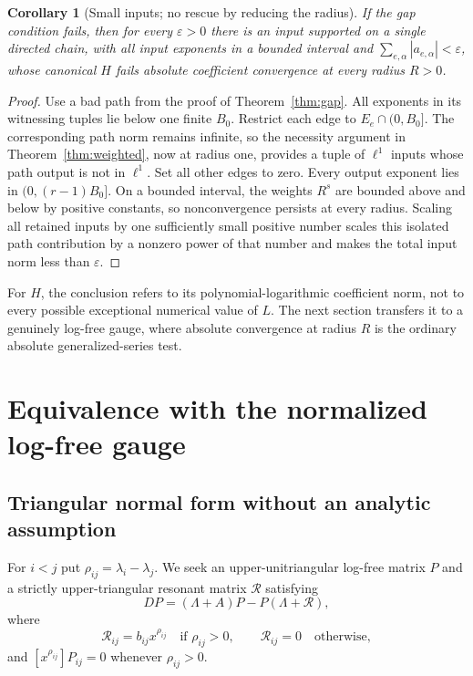 \documentclass[11pt,a4paper]{article}
\numberwithin{equation}{section}
\newtheorem{corollary}[theorem]{Corollary}
\theoremstyle{definition}
\theoremstyle{remark}
\newcommand{\eps}{\varepsilon}
\begin{document}
\begin{corollary}[Small inputs; no rescue by reducing the radius]
\label{cor:allradii}
If the gap condition fails, then for every $\eps>0$ there is an input
supported on a single directed chain, with all input exponents in a
bounded interval and
$\sum_{e,\alpha}|a_{e,\alpha}|<\eps$, whose canonical $H$ fails absolute
coefficient convergence at every radius $R>0$.
\end{corollary}
\begin{proof}
Use a bad path from the proof of Theorem~\ref{thm:gap}. All exponents in
its witnessing tuples lie below one finite $B_0$. Restrict each edge to
$E_e\cap(0,B_0]$. The corresponding path norm remains infinite, so the
necessity argument in Theorem~\ref{thm:weighted}, now at radius one,
provides a tuple of $\ell^1$ inputs whose path output is not in $\ell^1$.
Set all other edges to zero. Every output exponent lies in
$(0,(r-1)B_0]$. On a bounded interval, the weights $R^s$ are bounded above
and below by positive constants, so nonconvergence persists at every
radius. Scaling all retained inputs by one sufficiently small positive
number scales this isolated path contribution by a nonzero power of that
number and makes the total input norm less than $\eps$.
\end{proof}

For $H$, the conclusion refers to its polynomial-logarithmic coefficient
norm, not to every possible exceptional numerical value of $L$. The next
section transfers it to a genuinely log-free gauge, where absolute
convergence at radius $R$ is the ordinary absolute generalized-series test.

\section{Equivalence with the normalized log-free gauge}
\label{sec:gauge}

\subsection{Triangular normal form without an analytic assumption}
For $i<j$ put $\rho_{ij}=\lambda_i-\lambda_j$. We seek an upper-unitriangular
log-free matrix $P$ and a strictly upper-triangular resonant matrix
$\mathcal R$ satisfying
\begin{equation}\label{eq:P-equation}
 DP=(\Lambda+A)P-P(\Lambda+\mathcal R),
\end{equation}
where
\begin{equation}\label{eq:Rform}
 \mathcal R_{ij}=b_{ij}x^{\rho_{ij}}\quad\text{if }\rho_{ij}>0,
 \qquad \mathcal R_{ij}=0\quad\text{otherwise},
\end{equation}
and $[x^{\rho_{ij}}]P_{ij}=0$ whenever $\rho_{ij}>0$.
\end{document}
